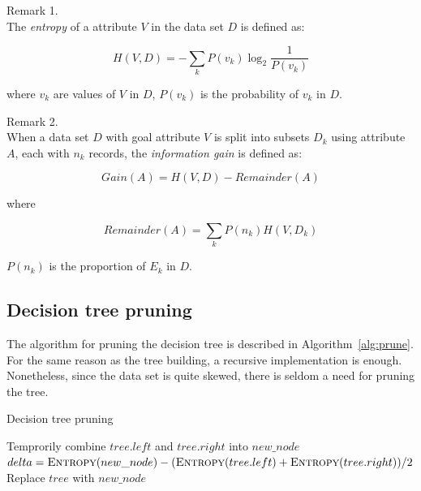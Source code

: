 \documentclass{article}
\begin{document}
\begin{description}
\item Remark 1. \hfill \\
The \textit{entropy} of a attribute $V$ in the data set $D$ is defined as:

$$
H(V, D) = -\sum_k P(v_k) \log_2\frac{1}{P(v_k)}
$$

where $v_k$ are values of $V$ in $D$, $P(v_k)$ is the probability of $v_k$ in $D$.

\item Remark 2.\hfill \\
When a data set $D$ with goal attribute $V$ is split into subsets $D_k$ using attribute $A$, each with $n_k$ records, the \textit{information gain} is defined as:

$$
Gain(A) = H(V, D) - Remainder(A)
$$

where

$$
Remainder(A) = \sum_k P(n_k) H(V, D_k)
$$

$P(n_k)$ is the proportion of $E_k$ in $D$.
\end{description}

\subsection{Decision tree pruning}

The algorithm for pruning the decision tree is described in Algorithm~\ref{alg:prune}. For the same reason as the tree building, a recursive implementation is enough. Nonetheless, since the data set is quite skewed, there is seldom a need for pruning the tree.

\begin{algorithm}[H]
\centering
\caption{Decision tree pruning}
\label{alg:prune}
  \begin{algorithmic}[1]
    		\State{}
    	\EndIf
    		\State{}
    	\EndIf
    		\State Temprorily combine $tree.left$ and $tree.right$ into $new\_node$
    		\State $delta = \Call{Entropy}{new\_node}-  (\Call{Entropy}{tree.left} + \Call{Entropy}{tree.right}) / 2$
    			\State Replace $tree$ with $new\_node$
    		\EndIf
    	\EndIf
    \EndFunction
  \end{algorithmic}
\end{algorithm}
\end{document}
